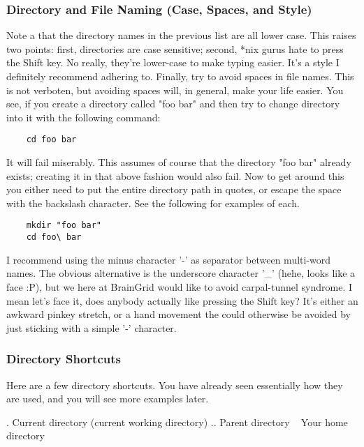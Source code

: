 \subsubsection{Directory and File Naming (Case, Spaces, and Style)} \mdseries
Note a that the directory names in the previous list are all lower case.  This raises two points: first, directories are case sensitive; second, *nix gurus hate to press the Shift key.  No really, they're lower-case to make typing easier.  It's a style I definitely recommend adhering to.  Finally, try to avoid spaces in file names.  This is not verboten, but avoiding spaces will, in general, make your life easier.  You see, if you create a directory called "foo bar" and then try to change directory into it with the following command:

	\begin{lstlisting}
	cd foo bar
	\end{lstlisting}

It will fail miserably.  This assumes of course that the directory "foo bar" already exists; creating it in that above fashion would also fail.  Now to get around this you either need to put the entire directory path in quotes, or escape the space with the backslash character.  See the following for examples of each.

	\begin{lstlisting}
	mkdir "foo bar"
	cd foo\ bar
	\end{lstlisting}

I recommend using the minus character '-' as separator between multi-word names.  The obvious alternative is the underscore character '\_' (hehe, looks like a face :P), but we here at BrainGrid would like to avoid carpal-tunnel syndrome.  I mean let's face it, does anybody actually like pressing the Shift key?  It's either an awkward pinkey stretch, or a hand movement the could otherwise be avoided by just sticking with a simple '-' character.  


\subsubsection{Directory Shortcuts} \mdseries
Here are a few directory shortcuts.  You have already seen essentially how they are used, and you will see more examples later.

	.	Current directory (current working directory)
	..	Parent directory
	~	Your home directory


